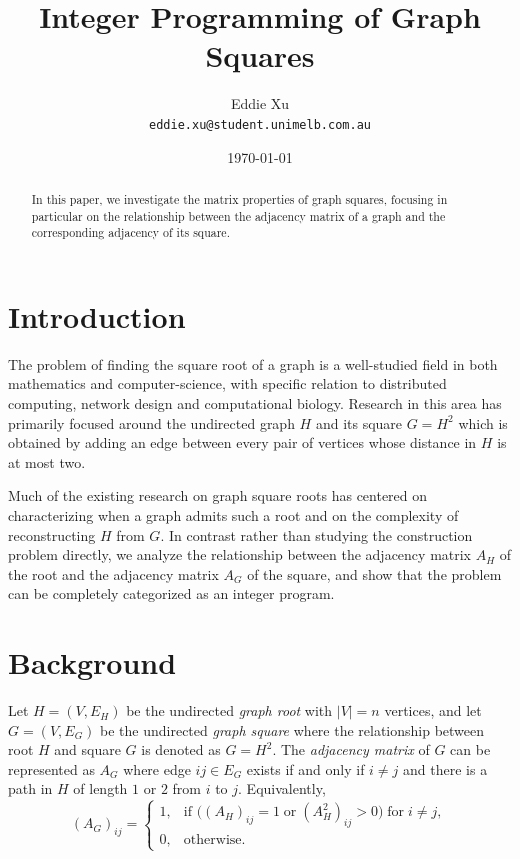 \documentclass[11pt]{article}
\title{Integer Programming of Graph Squares}
\author{Eddie Xu\\\small\texttt{eddie.xu@student.unimelb.com.au}}
\date{\today}
\begin{document}
\maketitle

\begin{abstract}
In this paper, we investigate the matrix properties of graph squares, focusing in particular on the
relationship between the adjacency matrix of a graph and the corresponding adjacency of its square. 
\end{abstract}

\tableofcontents

\section{Introduction}

The problem of finding the square root of a graph is a well-studied field in both mathematics and computer-science, 
with specific relation to distributed computing, network design and computational biology. Research in this area has
primarily focused around the undirected graph $H$ and its square $G = H^2$ which is obtained by adding an edge between 
every pair of vertices whose distance in $H$ is at most two. 

Much of the existing research on graph square roots has centered on characterizing when a graph admits such 
a root and on the complexity of reconstructing $H$ from $G$. In contrast rather than studying the construction problem 
directly, we analyze the relationship between the adjacency matrix $A_H$ of the root and the adjacency matrix $A_G$ of 
the square, and show that the problem can be completely categorized as an integer program. 

\section{Background}

Let $H = (V, E_H)$ be the undirected \emph{graph root} with $|V|=n$ vertices, and let $G = (V, E_G)$ be the undirected 
\emph{graph square} where the relationship between root $H$ and square $G$ is denoted as $G = H^2$. The
\emph{adjacency matrix} of $G$ can be represented as $A_G$ where edge $ij \in E_G$ exists if and only if $i \neq j$ and 
there is a path in $H$ of length $1$ or $2$ from $i$ to $j$. Equivalently, 
\[
(A_G)_{ij} =
\begin{cases}
1 ,& \text{if } \big( (A_H)_{ij} = 1 \;\text{or}\; (A_H^2)_{ij} > 0 \big) \; \text{for} \; i \neq j, \\
0 ,& \text{otherwise}.
\end{cases}
\]
\end{document}
